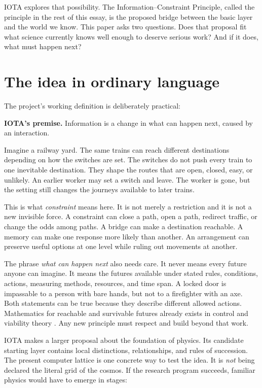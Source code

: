 \documentclass[11pt]{article}
\newcommand{\plainbox}[2]{%
  \begin{center}
  \colorbox{#1}{\parbox{0.92\linewidth}{\vspace{0.35em}#2\vspace{0.35em}}}
  \end{center}}
\begin{document}
IOTA explores that possibility. The Information--Constraint Principle, called
the principle in the rest of this essay, is the proposed bridge between the
basic layer and the world we know. This paper asks two questions. Does that
proposal fit what science currently knows well enough to deserve serious work?
And if it does, what must happen next?

\section*{The idea in ordinary language}

The project's working definition is deliberately practical:

\plainbox{icppale}{\small\textbf{IOTA's premise.}
Information is a change in what can happen next, caused by an interaction.}

Imagine a railway yard. The same trains can reach different destinations
depending on how the switches are set. The switches do not push every train to
one inevitable destination. They shape the routes that are open, closed, easy,
or unlikely. An earlier worker may set a switch and leave. The worker is gone,
but the setting still changes the journeys available to later trains.

This is what \emph{constraint} means here. It is not merely a restriction and
it is not a new invisible force. A constraint can close a path, open a path,
redirect traffic, or change the odds among paths. A bridge can make a
destination reachable. A memory can make one response more likely than
another. An arrangement can preserve useful options at one level while ruling
out movements at another.

The phrase \emph{what can happen next} also needs care. It never means every
future anyone can imagine. It means the futures available under stated rules,
conditions, actions, measuring methods, resources, and time span. A locked
door is impassable to a person with bare hands, but not to a firefighter with
an axe. Both statements can be true because they describe different allowed
actions. Mathematics for reachable and survivable futures already exists in
control and viability theory \citep{SaintPierre1994Viability,MitchellEtAl2005Reachable}.
Any new principle must respect and build beyond that work.

IOTA makes a larger proposal about the foundation of physics. Its candidate
starting layer contains local distinctions, relationships, and rules of
succession. The present computer lattice is one concrete way to test the idea.
It is \emph{not} being declared the literal grid of the cosmos. If the research
program succeeds, familiar physics would have to emerge in stages:
\end{document}
